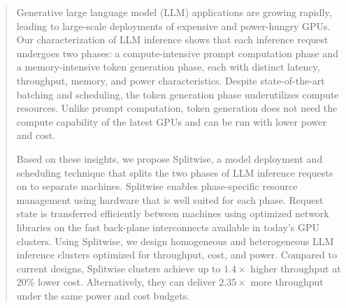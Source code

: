 \begin{abstract}

Generative large language model (LLM) applications are growing rapidly, leading to large-scale deployments of expensive and power-hungry GPUs.
Our characterization of LLM inference shows that each inference request undergoes two phases: a compute-intensive prompt computation phase and a memory-intensive token generation phase, each with distinct latency, throughput, memory, and power characteristics.
Despite state-of-the-art batching and scheduling, the token generation phase underutilizes compute resources.
Unlike prompt computation, token generation does not need the compute capability of the latest GPUs and can be run with lower power and cost. 

Based on these insights, we propose Splitwise, a model deployment and scheduling technique that splits the two phases of LLM inference requests on to separate machines.
Splitwise enables phase-specific resource management using hardware that is well suited for each phase.
Request state is transferred efficiently between machines using optimized network libraries on the fast back-plane interconnects available in today's GPU clusters.
Using Splitwise, we design homogeneous and heterogeneous LLM inference clusters optimized for throughput, cost, and power.
Compared to current designs, Splitwise clusters achieve up to $1.4\times$ higher throughput at 20\% lower cost. Alternatively, they can deliver $2.35\times$ more throughput under the same power and cost budgets.

\end{abstract}



